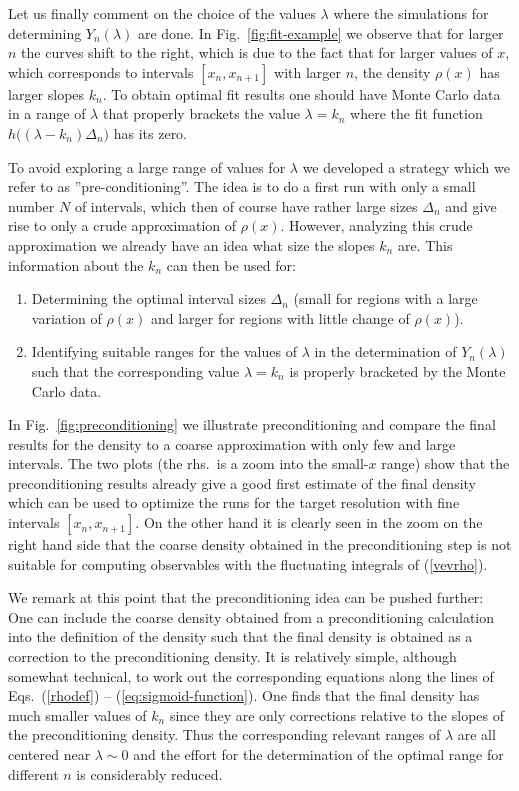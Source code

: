 \documentclass[a4paper,11pt]{article}
\begin{document}
Let us finally comment on the choice of the values $\lambda$ where the simulations for 
determining $Y_n(\lambda)$ are done. 
In Fig.~\ref{fig:fit-example} we observe that for larger $n$ the curves shift to the right,
which is due to the fact that for larger values of $x$, which corresponds to intervals $[x_n, x_{n+1}]$ with larger $n$, 
the density $\rho(x)$ has larger slopes $k_n$. To obtain optimal fit results one should have Monte Carlo data
in a range of $\lambda$ that properly brackets the value $\lambda = k_n$ where the fit function  
$h\Big(\!(\lambda-k_n)\Delta_n \!\Big)$ has its zero. 

To avoid exploring a large range of values for $\lambda$ we developed a strategy which we refer to as 
''pre-conditioning''. The idea is to do a first run with only a small number $N$ of intervals, which then of course 
have rather large sizes $\Delta_n$ and give rise to only a crude approximation of $\rho(x)$. 
However, analyzing this crude
approximation we already have an idea what size the slopes $k_n$ are. This information about the $k_n$ 
can then be used for:
\begin{enumerate}
\item Determining the optimal interval sizes $\Delta_n$ (small for regions with a large variation of $\rho(x)$ and 
larger for regions with little change of $\rho(x)$).  

\item Identifying suitable ranges for the values of $\lambda$ in the 
determination of $Y_n(\lambda)$ such that the corresponding value $\lambda = k_n$ is properly bracketed by the
Monte Carlo data.  
\end{enumerate}

In Fig.~\ref{fig:preconditioning} we illustrate preconditioning and compare the final results for
the density to a coarse approximation with only few and large intervals. The two plots (the rhs.\ is a zoom into the
small-$x$ range) show that the preconditioning results already give a good first estimate of the final density which 
can be used to optimize the runs for the target resolution with fine intervals $[x_n, x_{n+1}]$. On the other hand it is 
clearly seen in the zoom on the right hand side that the coarse density obtained in the preconditioning step is not suitable 
for computing observables with the fluctuating integrals of (\ref{vevrho}).

We remark at this point that the preconditioning idea can be pushed further: One can include the coarse density obtained
from a preconditioning calculation into the definition of the density such that the final density is obtained as a correction 
to the preconditioning density. It is relatively simple, although somewhat technical, to work out the corresponding 
equations along the lines of Eqs.~(\ref{rhodef}) -- (\ref{eq:sigmoid-function}). One finds that the final density
has much smaller values of $k_n$ since they are only corrections relative to the slopes of the preconditioning
density. Thus the corresponding relevant ranges of $\lambda$ are all centered near $\lambda \sim 0$ and the 
effort for the determination of the optimal range for different $n$ is considerably reduced. 
\end{document}
